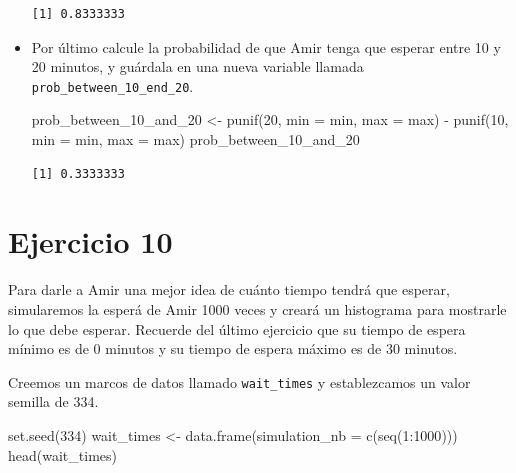 \documentclass[
  letterpaper,
  DIV=11,
  numbers=noendperiod]{scrreprt}
\newenvironment{Shaded}{\begin{snugshade}}{\end{snugshade}}
\newcommand{\AttributeTok}[1]{\textcolor[rgb]{0.40,0.45,0.13}{#1}}
\newcommand{\DecValTok}[1]{\textcolor[rgb]{0.68,0.00,0.00}{#1}}
\newcommand{\FunctionTok}[1]{\textcolor[rgb]{0.28,0.35,0.67}{#1}}
\newcommand{\NormalTok}[1]{\textcolor[rgb]{0.00,0.23,0.31}{#1}}
\newcommand{\OtherTok}[1]{\textcolor[rgb]{0.00,0.23,0.31}{#1}}
\newcommand{\SpecialCharTok}[1]{\textcolor[rgb]{0.37,0.37,0.37}{#1}}
\begin{document}
\begin{itemize}
\begin{verbatim}
[1] 0.8333333
\end{verbatim}
\item
  Por último calcule la probabilidad de que Amir tenga que esperar entre
  10 y 20 minutos, y guárdala en una nueva variable llamada
  \texttt{prob\_between\_10\_end\_20}.

\begin{Shaded}
\begin{Highlighting}[]
\NormalTok{prob\_between\_10\_and\_20 }\OtherTok{\textless{}{-}} \FunctionTok{punif}\NormalTok{(}\DecValTok{20}\NormalTok{, }\AttributeTok{min =}\NormalTok{ min, }\AttributeTok{max =}\NormalTok{ max) }\SpecialCharTok{{-}} \FunctionTok{punif}\NormalTok{(}\DecValTok{10}\NormalTok{, }\AttributeTok{min =}\NormalTok{ min, }\AttributeTok{max =}\NormalTok{ max)}
\NormalTok{prob\_between\_10\_and\_20}
\end{Highlighting}
\end{Shaded}

\begin{verbatim}
[1] 0.3333333
\end{verbatim}
\end{itemize}

\hypertarget{ejercicio-10}{%
\section{Ejercicio 10}\label{ejercicio-10}}

Para darle a Amir una mejor idea de cuánto tiempo tendrá que esperar,
simularemos la esperá de Amir 1000 veces y creará un histograma para
mostrarle lo que debe esperar. Recuerde del último ejercicio que su
tiempo de espera mínimo es de 0 minutos y su tiempo de espera máximo es
de 30 minutos.

Creemos un marcos de datos llamado \texttt{wait\_times} y establezcamos
un valor semilla de 334.

\begin{Shaded}
\begin{Highlighting}[]
\FunctionTok{set.seed}\NormalTok{(}\DecValTok{334}\NormalTok{)}
\NormalTok{wait\_times }\OtherTok{\textless{}{-}} \FunctionTok{data.frame}\NormalTok{(}\AttributeTok{simulation\_nb =} \FunctionTok{c}\NormalTok{(}\FunctionTok{seq}\NormalTok{(}\DecValTok{1}\SpecialCharTok{:}\DecValTok{1000}\NormalTok{)))}
\FunctionTok{head}\NormalTok{(wait\_times)}
\end{Highlighting}
\end{Shaded}
\end{document}
